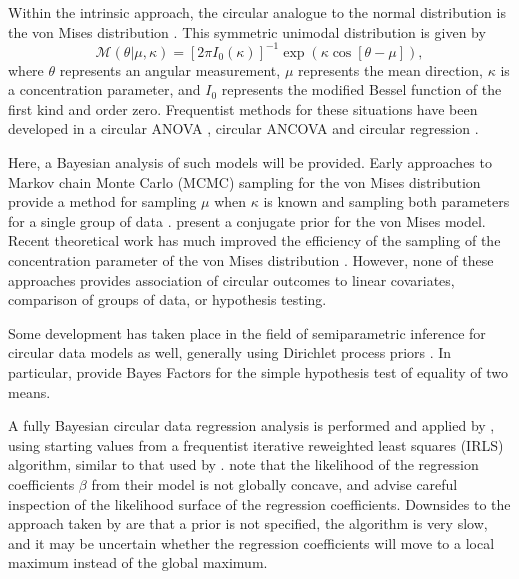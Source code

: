 \documentclass[10pt,a4paper]{article}\usepackage[]{graphicx}\usepackage[]{color}
\begin{document}
Within the intrinsic approach, the circular analogue to the normal distribution is the von Mises distribution \citep{von1918ganzzahligkeit}. This symmetric unimodal distribution is given by
\begin{equation}
\mathcal{M}(\theta \vert \mu, \kappa) = \left[ 2 \pi I_0(\kappa) \right]^{-1}
\exp \left( \kappa \cos \left[ \theta - \mu \right] \right),
\end{equation}
where \( \theta \) represents an angular measurement, \( \mu \) represents the mean direction, \( \kappa \) is a concentration parameter, and $I_0$ represents the modified Bessel function of the first kind and order zero. Frequentist methods for these situations have been developed in a circular ANOVA \citep{harrison1986analysis,harrison1988development}, circular ANCOVA \citep{artes2008hypothesis} and circular regression \citep{fisher1992regression}.

Here, a Bayesian analysis of such models will be provided. Early approaches to Markov chain Monte Carlo (MCMC) sampling for the von Mises distribution provide a method for sampling \( \mu \) when \( \kappa \) is known \citep{mardia1976bayesian} and sampling both parameters for a single group of data \citep{damien1999fullbayes}. \citet{guttorp1988finding} present a conjugate prior for the von Mises model. Recent theoretical work has much improved the efficiency of the sampling of the concentration parameter of the von Mises distribution \citep{forbes2014fast}. However, none of these approaches provides association of circular outcomes to linear covariates, comparison of groups of data, or hypothesis testing.

Some development has taken place in the field of semiparametric inference for circular data models as well, generally using Dirichlet process priors \citep{Bhattacharya2009, ghosh2003semiparametric, george2006semiparametric, mcvinish2008semiparametric}. In particular, \citet{ghosh2003semiparametric} provide Bayes Factors for the simple hypothesis test of equality of two means.

A fully Bayesian circular data regression analysis is performed and applied by \citet{gill2010}, using starting values from a frequentist iterative reweighted least squares (IRLS) algorithm, similar to that used by \citet{fisher1992regression}. \citet{gill2010} note that the likelihood of the regression coefficients $\beta$ from their model is not globally concave, and advise careful inspection of the likelihood surface of the regression coefficients. Downsides to the approach taken by \citet{gill2010} are that a prior is not specified, the algorithm is very slow, and it may be uncertain whether the regression coefficients will move to a local maximum instead of the global maximum.
\end{document}
